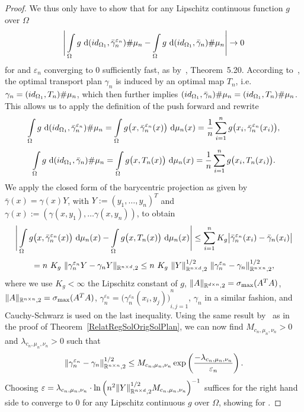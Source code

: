 \begin{proof}
	We thus only have to show that for any Lipschitz continuous function $g$ over $\Omega$
	\[ \Bigg\lvert \int\limits_{\Omega} g~\D[{\push[(id_{\Omega_1}, \bar{\gamma}_n^{\varepsilon_n})]{\mu_n}}] - \int\limits_{\Omega} g~\D[{\push[(id_{\Omega_1}, \bar{\gamma}_n)]{\mu_n}}] \Bigg\rvert \rightarrow 0 \]
	for \Ninf{} and $\varepsilon_n$ converging to $0$ sufficiently fast, as  by~\cite{Vill2009}, Theorem~5.20. According to~\cite{Seg2018}, the optimal transport plan $\gamma_n$ is induced by an optimal map $T_n$, i.e.~$\gamma_n = \push[(id_{\Omega_1}, T_n)]{\mu_n}$, which then further implies $\push[(id_{\Omega_1}, \bar{\gamma}_n)]{\mu_n} = \push[(id_{\Omega_1}, T_n)]{\mu_n}$. This allows us to apply the definition of the push forward and rewrite
	\[ \int\limits_{\Omega} g~\D[{\push[(id_{\Omega_1}, \bar{\gamma}_n^{\varepsilon_n})]{\mu_n}}] = \int\limits_{\Omega} g\big( x, \bar{\gamma}_n^{\varepsilon_n}(x) \big)~\Dx{\mu_n} = \frac{1}{n} \sum\limits_{i = 1}^n g\big( x_i, \bar{\gamma}_n^{\varepsilon_n}(x_i) \big), \]
	\[ \int\limits_{\Omega} g~\D[{\push[(id_{\Omega_1}, \bar{\gamma}_n)]{\mu_n}}] = \int\limits_{\Omega} g\big( x, T_n(x) \big)~\Dx{\mu_n} = \frac{1}{n} \sum\limits_{i = 1}^n g\big( x_i, T_n(x_i) \big). \]
	We apply the closed form of the barycentric projection as given by~\cite{Seg2018} $\bar{\gamma}(x) = \gamma(x) Y$, with $Y := {(y_1, \dots, y_n)}^T$ and $\gamma(x) := (\gamma(x, y_1), \dots \gamma(x, y_n))$, to obtain
	\[ \Bigg\lvert \int\limits_{\Omega} g\big( x, \bar{\gamma}_n^{\varepsilon_n}(x) \big)~\Dx{\mu_n} - \int\limits_{\Omega} g\big( x, T_n(x) \big)~\Dx{\mu_n} \Bigg\rvert \le \sum\limits_{i = 1}^n K_g \big\vert \bar{\gamma}_n^{\varepsilon_n}(x_i) - \bar{\gamma}_n(x_i) \big\vert \]
	\[ = n~K_g~\Vert \gamma_n^{\varepsilon_n} Y - \gamma_n Y \Vert_{\R^{n \times d}, 2} \le n~K_g~\Vert Y \Vert_{\R^{n \times d}, 2}^{1/2}~\Vert \gamma_n^{\varepsilon_n} - \gamma_n \Vert^{1/2}_{\R^{n \times n}, 2}, \]
	where we use $K_g < \infty$ the Lipschitz constant of $g$, $\Vert A \Vert_{\R^{d \times n}, 2} = \sigma_{\max}(A^T A)$, $\Vert A \Vert_{\R^{n \times n}, 2} = \sigma_{\max}(A^T A)$, $\gamma_n^{\varepsilon_n} = {\big( \gamma_n^{\varepsilon_n}(x_i, y_j) \big)}_{i, j = 1}^n$, $\gamma_n$ in a similar fashion, and Cauchy-Schwarz is used on the last inequality. Using the same result by~\cite{Comi1994} as in the proof of Theorem~\ref{RelatRegSolOrigSolPlan}, we can now find $M_{c_n, \mu_n, \nu_n} > 0$ and $\lambda_{c_n, \mu_n, \nu_n} > 0$ such that
	\[ \Vert \gamma_n^{\varepsilon_n} - \gamma_n \Vert^{1/2}_{\R^{n \times n}, 2} \le M_{c_n, \mu_n, \nu_n} \exp\left( \frac{-\lambda_{c_n, \mu_n, \nu_n}}{\varepsilon_n} \right). \]
	Choosing $\varepsilon = \lambda_{c_n, \mu_n, \nu_n} \cdot {\ln\left( n^2 \Vert Y \Vert^{1/2}_{\R^{n \times d}, 2} M_{c_n, \mu_n, \nu_n} \right)}^{-1}$ suffices for the right hand side to converge to $0$ for any Lipschitz continuous $g$ over $\Omega$, showing  for \Ninf.
\end{proof}

